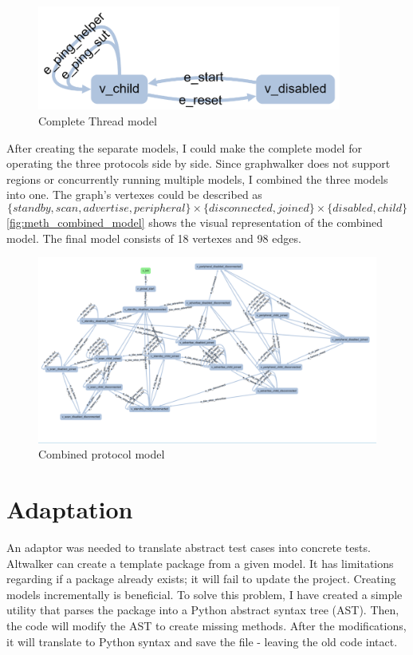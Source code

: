 \begin{figure}
    \includegraphics[width=100mm, keepaspectratio]{figures/model_thread_finished.png}
    \caption{Complete Thread model}
\end{figure}

After creating the separate models, I could make the complete model for operating the three protocols side by side. Since graphwalker does not support regions or concurrently running multiple models, I combined the three models into one. The graph's vertexes could be described as \[
    \{standby, scan, advertise, peripheral\} \times  \{disconnected, joined\} \times \{disabled, child\}  
\]
\autoref{fig:meth_combined_model} shows the visual representation of the combined model. The final model consists of 18 vertexes and 98 edges.

\begin{figure}
    \centering
    \includegraphics[width=150mm, keepaspectratio]{figures/combined_model.png}
    \caption{Combined protocol model}
    \label{fig:meth_combined_model}
\end{figure}


\section{Adaptation}
\label{sec:meth:ada}

An adaptor was needed to translate abstract test cases into concrete tests. Altwalker can create a template package from a given model. It has limitations regarding if a package already exists; it will fail to update the project. Creating models incrementally is beneficial. To solve this problem, I have created a simple utility that parses the package into a Python abstract syntax tree (AST). Then, the code will modify the AST to create missing methods. After the modifications, it will translate to Python syntax and save the file - leaving the old code intact.

